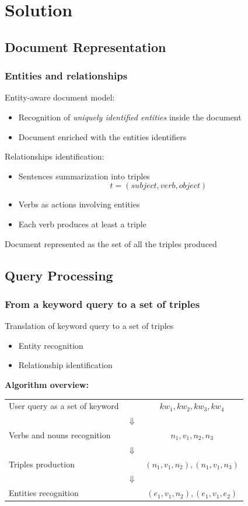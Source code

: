 \documentclass{beamer}
\begin{document}
\section{Solution}
\subsection{Document Representation}

\begin{frame}
\frametitle{Entities and relationships}
Entity-aware document model:
\begin{itemize}
\item Recognition of \emph{uniquely identified entities} inside the
  document
\item Document enriched with the entities identifiers
\end{itemize}
\bigskip
Relationships identification:
\begin{itemize}
\item Sentences summarization into triples
$$
t = (subject, verb, object)
$$
\item Verbs as actions involving entities
\item Each verb produces at least a triple
\end{itemize}
\bigskip
Document represented as the set of all the triples produced
\end{frame}

\subsection{Query Processing}

\begin{frame}
\frametitle{From a keyword query to a set of triples}
Translation of keyword query to a set of triples
\begin{itemize}
\item Entity recognition
\item Relationship identification
\end{itemize}
\vspace{5mm}
{\color{red}\bfseries{Algorithm overview:}}\\
\vspace{3mm}
\begin{tabular}{lcc}
User query as a set of keyword && $kw_{1}, kw_{2}, kw_{3}, kw_{4}$\\
& $\Downarrow$ &\\
Verbs and nouns recognition && $n_{1}, v_{1}, n_{2}, n_{3}$\\
& $\Downarrow$ &\\
Triples production && $(n_{1}, v_{1}, n_{2}), (n_{1}, v_{1}, n_{3})$\\
& $\Downarrow$ &\\
Entities recognition && $(e_{1}, v_{1}, n_{2}), (e_{1}, v_{1}, e_{2})$\\
\end{tabular}
\end{frame}
\end{document}
